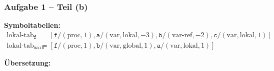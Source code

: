 \documentclass{beamer}
\begin{document}
\begin{frame} \frametitle{Aufgabe 1 -- Teil (b)}
	\scriptsize
	
	\textbf{Symboltabellen:}	
	\begin{align*}
		\text{lokal-tab}_{\texttt{f}} &= [ \texttt{f}/(\text{proc}, 1), \texttt{a}/(\text{var}, \text{lokal}, -3), \texttt{b}/(\text{var-ref}, -2), \texttt{c}/(\text{var}, \text{lokal}, 1) ] \\
		\text{lokal-tab}_{\texttt{main}} &= [ \texttt{f}/(\text{proc}, 1), \texttt{b}/(\text{var}, \text{global}, 1), \texttt{a}/(\text{var}, \text{lokal}, 1) ]
	\end{align*}

	\textbf{Übersetzung:}
	

\end{frame}
\end{document}
